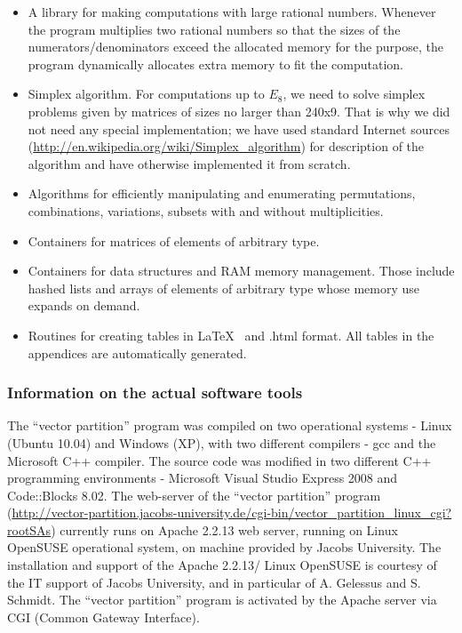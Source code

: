 \documentclass[12pt]{report}
\begin{document}
\begin{itemize}
\item A library for making computations with large rational numbers. Whenever the program multiplies two rational numbers so that the sizes of the numerators/denominators exceed the allocated memory for the purpose, the program dynamically allocates extra memory to fit the computation. 
\item Simplex algorithm. For computations up to $E_8$, we need to solve simplex problems given by matrices of sizes no larger than 240x9. That is why we did not need any special implementation; we have used standard Internet sources \\ (\url{http://en.wikipedia.org/wiki/Simplex_algorithm}) for description of the algorithm and have otherwise implemented it from scratch.
\item Algorithms for efficiently manipulating and enumerating permutations, combinations, variations, subsets with and without multiplicities.
\item Containers for matrices of elements of arbitrary type. 
\item Containers for data structures and RAM memory management. Those include hashed lists and arrays of elements of arbitrary type whose memory use expands on demand.
\item Routines for creating tables in \LaTeX~ and .html format. All tables in the appendices are automatically generated.
\end{itemize}
\subsubsection{Information on the actual software tools}
The ``vector partition'' program was compiled on two operational systems - Linux (Ubuntu 10.04) and Windows (XP), with two different compilers - gcc and the Microsoft C++ compiler. The source code was modified in two different C++ programming environments - Microsoft Visual Studio Express 2008 and Code::Blocks 8.02. The web-server of the ``vector partition'' program\\ (\url{http://vector-partition.jacobs-university.de/cgi-bin/vector_partition_linux_cgi?rootSAs})  currently runs on Apache 2.2.13 web server, running on Linux OpenSUSE operational system, on machine provided by Jacobs University. The installation and support of the Apache 2.2.13/ Linux OpenSUSE is courtesy of the IT support of Jacobs University, and in particular of A. Gelessus and S. Schmidt. The ``vector partition'' program is activated by the Apache server via CGI (Common Gateway Interface). 
\end{document}
